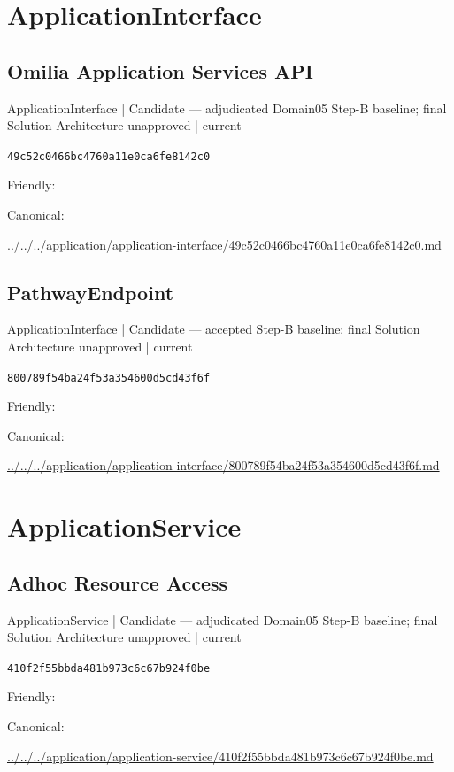 \documentclass[10pt,a4paper]{article}
\begin{document}
\section*{ApplicationInterface}
\subsection*{Omilia Application Services API}
{\small ApplicationInterface | Candidate — adjudicated Domain05 Step-B baseline; final Solution Architecture unapproved | current}\par
\texttt{49c52c0466bc4760a11e0ca6fe8142c0}\par
Friendly: \par
Canonical: \par
{\footnotesize\url{../../../application/application-interface/49c52c0466bc4760a11e0ca6fe8142c0.md}}\par
\subsection*{PathwayEndpoint}
{\small ApplicationInterface | Candidate — accepted Step-B baseline; final Solution Architecture unapproved | current}\par
\texttt{800789f54ba24f53a354600d5cd43f6f}\par
Friendly: \par
Canonical: \par
{\footnotesize\url{../../../application/application-interface/800789f54ba24f53a354600d5cd43f6f.md}}\par
\section*{ApplicationService}
\subsection*{Adhoc Resource Access}
{\small ApplicationService | Candidate — adjudicated Domain05 Step-B baseline; final Solution Architecture unapproved | current}\par
\texttt{410f2f55bbda481b973c6c67b924f0be}\par
Friendly: \par
Canonical: \par
{\footnotesize\url{../../../application/application-service/410f2f55bbda481b973c6c67b924f0be.md}}\par
\end{document}
